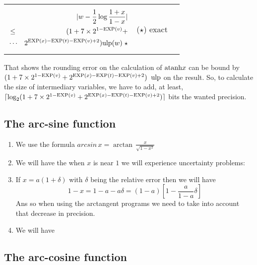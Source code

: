 \documentclass[12pt]{amsart}
\def\n{\textnormal}
\def\ulp{{\rm ulp}}
\def\Exp{{\rm EXP}}
\begin{document}
\begin{center}
\begin{tabular}{l l l}
\begin{minipage}{7.5cm}
\begin{eqnarray}\nonumber
  &&|w-\frac{1}{2}\log{\frac{1+x}{1-x}}| \\\nonumber
  &       \leq& (1+7 \times 2^{1-\Exp(v)} + \\\nonumber
  &       \cdots&  2^{\Exp(x)-\Exp(t)-\Exp(v)+2}) \ulp(w) \;\star
\end{eqnarray}


\end{minipage} &
\begin{minipage}{6cm}

($\star$) exact


\end{minipage}
\end{tabular}
\end{center}

That shows the rounding error on the calculation of $\n{atanh} x$ can
be bound by $ (1+7 \times 2^{1-\Exp(v)} +
2^{\Exp(x)-\Exp(t)-\Exp(v)+2})\;\; \ulp$ on the result. So, to
calculate the size of intermediary variables, we have to add, at
least, $\lceil \log_2 (1+7 \times 2^{1-\Exp(v)} +
2^{\Exp(x)-\Exp(t)-\Exp(v)+2}) \rceil$ bits the wanted precision.
 
\subsection{The arc-sine function}

\begin{enumerate}
\item We use the formula $arcsin\,x=\arctan\,\frac{x}{\sqrt{1-x^2}}$
\item We will have the when $x$ is near $1$ we will experience uncertainty problems:
\item If $x=a(1+\delta)$ with $\delta$ being the relative error then we will have
\begin{equation*}
1-x=1-a-a\delta=(1-a)[1-\frac{a}{1-a}\delta]
\end{equation*}
Ans so when using the arctangent programs we need to take into account that decrease in precision.
\item We will have 
\end{enumerate}

\subsection{The arc-cosine function} %
\end{document}
